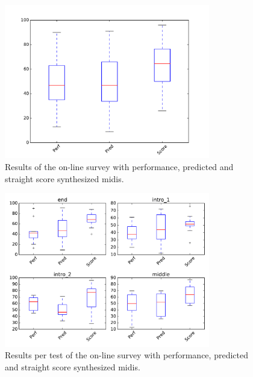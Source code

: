 \begin{appendices}


\begin{figure}
\caption{Results of the on-line survey with performance, predicted and straight score synthesized midis.}
\label{fig_app:survey}
\centering
\includegraphics[width=0.8\textwidth]{Figures/survey.pdf}
\end{figure}

\begin{figure}
\caption{Results per test of the on-line survey with performance, predicted and straight score synthesized midis.}
\label{fig_app:survey_test}
\centering
\includegraphics[width=0.8\textwidth]{Figures/survey_tests.pdf}
\end{figure}


\end{appendices}
